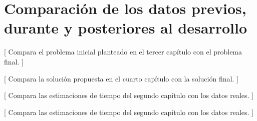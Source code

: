 \chapter{Comparación de los datos previos, durante y posteriores al desarrollo}

[ Compara el problema inicial planteado en el tercer capítulo con el problema final. ]

[ Compara la solución propuesta en el cuarto capítulo con la solución final. ]

[ Compara las estimaciones de tiempo del segundo capítulo con los datos reales. ]

[ Compara las estimaciones de tiempo del segundo capítulo con los datos reales. ]

